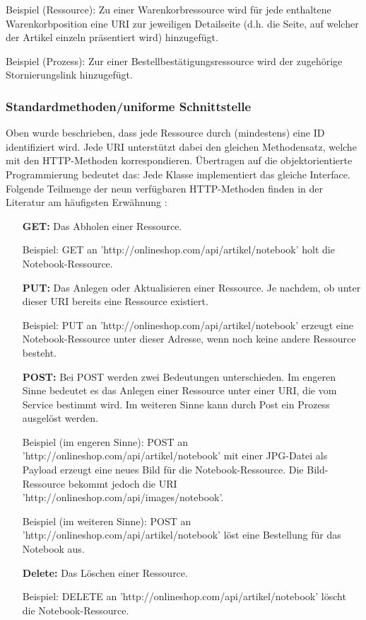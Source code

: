 \documentclass[11pt, a4paper, titlepage, listof=totoc, bibliography=totoc, index=totoc, twoside, openright, headings=normal]{scrreprt}
\begin{document}
Beispiel (Ressource): Zu einer Warenkorbressource wird für jede enthaltene Warenkorbposition eine URI zur jeweiligen Detailseite (d.h. die Seite, auf welcher der Artikel einzeln präsentiert wird) hinzugefügt.

Beispiel (Prozess): Zur einer Bestellbestätigungsressource wird der zugehörige Stornierungslink hinzugefügt.

\subsubsection*{Standardmethoden/uniforme Schnittstelle}
Oben wurde beschrieben, dass jede Ressource durch (mindestens) eine ID identifiziert wird. Jede URI unterstützt dabei den gleichen Methodensatz, welche mit den HTTP-Methoden korrespondieren. Übertragen auf die objektorientierte Programmierung bedeutet das: Jede Klasse implementiert das gleiche Interface. Folgende Teilmenge der neun verfügbaren HTTP-Methoden finden in der Literatur am häufigsten Erwähnung \citep{richardson07, tilkov11, wilde11}:
\begin{enumerate}[a.]
\item [\textbf{GET:}] Das Abholen einer Ressource.\vspace{0.2em}

Beispiel: GET an 'http://onlineshop.com/api/artikel/notebook' holt die Notebook-Ressource.
\item [\textbf{PUT:}] Das Anlegen oder Aktualisieren einer Ressource. Je nachdem, ob unter dieser URI bereits eine Ressource existiert.\vspace{0.2em}

Beispiel: PUT an 'http://onlineshop.com/api/artikel/notebook' erzeugt eine Notebook-Ressource unter dieser Adresse, wenn noch keine andere Ressource besteht.
\item [\textbf{POST:}] Bei POST werden zwei Bedeutungen unterschieden. Im engeren Sinne bedeutet es das Anlegen einer Ressource unter einer URI, die vom Service bestimmt wird. Im weiteren Sinne kann durch Post ein Prozess ausgelöst werden.\vspace{0.2em}

Beispiel (im engeren Sinne): POST an 'http://onlineshop.com/api/artikel/notebook' mit einer JPG-Datei als Payload erzeugt eine neues Bild für die Notebook-Ressource. Die Bild-Ressource bekommt jedoch die URI 'http://onlineshop.com/api/images/notebook'.

Beispiel (im weiteren Sinne): POST an 'http://onlineshop.com/api/artikel/notebook' löst eine Bestellung für das Notebook aus.
\item [\textbf{Delete:}] Das Löschen einer Ressource.\vspace{0.2em}

Beispiel: DELETE an 'http://onlineshop.com/api/artikel/notebook' löscht die Notebook-Ressource.
\end{enumerate}
\end{document}
